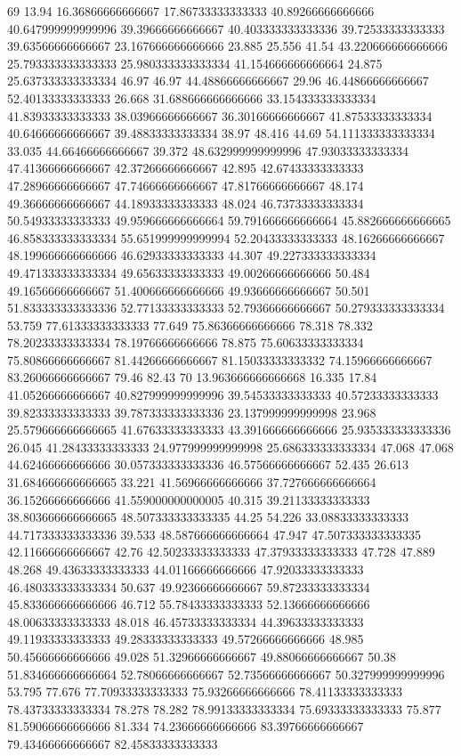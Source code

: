 69 13.94 16.36866666666667 17.86733333333333 40.89266666666666 40.647999999999996 39.39666666666667 40.403333333333336 39.72533333333333 39.63566666666667 23.167666666666666 23.885 25.556 41.54 43.220666666666666 25.793333333333333 25.980333333333334 41.154666666666664 24.875 25.637333333333334 46.97 46.97 44.48866666666667 29.96 46.44866666666667 52.40133333333333 26.668 31.688666666666666 33.154333333333334 41.83933333333333 38.03966666666667 36.30166666666667 41.87533333333334 40.64666666666667 39.48833333333334 38.97 48.416 44.69 54.111333333333334 33.035 44.66466666666667 39.372 48.632999999999996 47.93033333333334 47.41366666666667 42.37266666666667 42.895 42.67433333333333 47.28966666666667 47.74666666666667 47.81766666666667 48.174 49.36666666666667 44.18933333333333 48.024 46.73733333333334 50.54933333333333 49.959666666666664 59.791666666666664 45.882666666666665 46.858333333333334 55.651999999999994 52.20433333333333 48.16266666666667 48.199666666666666 46.62933333333333 44.307 49.227333333333334 49.471333333333334 49.65633333333333 49.00266666666666 50.484 49.16566666666667 51.400666666666666 49.93666666666667 50.501 51.833333333333336 52.77133333333333 52.79366666666667 50.279333333333334 53.759 77.61333333333333 77.649 75.86366666666666 78.318 78.332 78.20233333333334 78.19766666666666 78.875 75.60633333333334 75.80866666666667 81.44266666666667 81.15033333333332 74.15966666666667 83.26066666666667 79.46 82.43
70 13.963666666666668 16.335 17.84 41.05266666666667 40.827999999999996 39.54533333333333 40.57233333333333 39.82333333333333 39.787333333333336 23.137999999999998 23.968 25.579666666666665 41.67633333333333 43.391666666666666 25.935333333333336 26.045 41.28433333333333 24.977999999999998 25.686333333333334 47.068 47.068 44.62466666666666 30.057333333333336 46.57566666666667 52.435 26.613 31.684666666666665 33.221 41.56966666666666 37.727666666666664 36.15266666666666 41.559000000000005 40.315 39.21133333333333 38.803666666666665 48.507333333333335 44.25 54.226 33.08833333333333 44.717333333333336 39.533 48.587666666666664 47.947 47.507333333333335 42.11666666666667 42.76 42.50233333333333 47.37933333333333 47.728 47.889 48.268 49.43633333333333 44.01166666666666 47.92033333333333 46.480333333333334 50.637 49.92366666666667 59.87233333333334 45.833666666666666 46.712 55.78433333333333 52.13666666666666 48.00633333333333 48.018 46.45733333333334 44.39633333333333 49.11933333333333 49.28333333333333 49.57266666666666 48.985 50.45666666666666 49.028 51.32966666666667 49.88066666666667 50.38 51.834666666666664 52.78066666666667 52.73566666666667 50.327999999999996 53.795 77.676 77.70933333333333 75.93266666666666 78.41133333333333 78.43733333333334 78.278 78.282 78.99133333333334 75.69333333333333 75.877 81.59066666666666 81.334 74.23666666666666 83.39766666666667 79.43466666666667 82.45833333333333
